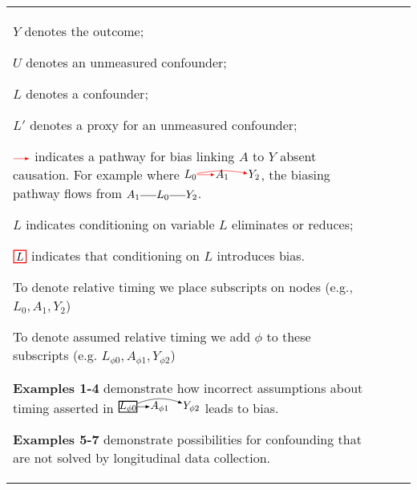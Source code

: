 {\begin{tabular}{>{\raggedright\arraybackslash\small}m{0.35cm} >{\raggedright\arraybackslash\small}m{5.5cm} >{\raggedright\arraybackslash\small}m{3.5cm} >{\raggedright\arraybackslash\small}m{3.5cm}}
{{$Y$ denotes the outcome;

$U$ denotes an unmeasured confounder;

$L$ denotes a confounder;

$L'$ denotes a proxy for an unmeasured confounder;

$\rightarrowred$ indicates a pathway for bias linking $A$ to $Y$ absent causation. For example where $\commoncauseAsupershort$, the biasing pathway flows from $A_1 \association L_0 \association Y_2$.

$\boxed{L}$ indicates conditioning on variable $L$ eliminates or reduces;

$\boxedred{L}$ indicates that conditioning on $L$ introduces bias.

To denote relative timing we place subscripts on nodes (e.g., $L_0, A_1, Y_2$)


To denote assumed relative timing we add $\phi$ to these subscripts (e.g. $L_{\phi 0}, A_{\phi 1}, Y_{\phi 2}$)

\textbf{Examples 1-4} demonstrate how incorrect assumptions about timing asserted in $\atoyassumedtiny$ leads to bias.

\textbf{Examples 5-7} demonstrate possibilities for confounding that are not solved by longitudinal data collection.}}
\end{tabular}
}

